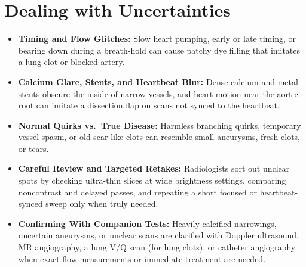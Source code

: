 \section{Dealing with Uncertainties}
\begin{itemize}
    \item \textbf{Timing and Flow Glitches:} Slow heart pumping, early or late timing, or bearing down during a breath-hold can cause patchy dye filling that imitates a lung clot or blocked artery.
    \item \textbf{Calcium Glare, Stents, and Heartbeat Blur:} Dense calcium and metal stents obscure the inside of narrow vessels, and heart motion near the aortic root can imitate a dissection flap on scans not synced to the heartbeat.
    \item \textbf{Normal Quirks vs.\ True Disease:} Harmless branching quirks, temporary vessel spasm, or old scar-like clots can resemble small aneurysms, fresh clots, or tears.
    \item \textbf{Careful Review and Targeted Retakes:} Radiologists sort out unclear spots by checking ultra-thin slices at wide brightness settings, comparing noncontrast and delayed passes, and repeating a short focused or heartbeat-synced sweep only when truly needed.
    \item \textbf{Confirming With Companion Tests:} Heavily calcified narrowings, uncertain aneurysms, or unclear scans are clarified with Doppler ultrasound, MR angiography, a lung V/Q scan (for lung clots), or catheter angiography when exact flow measurements or immediate treatment are needed.
\end{itemize}

